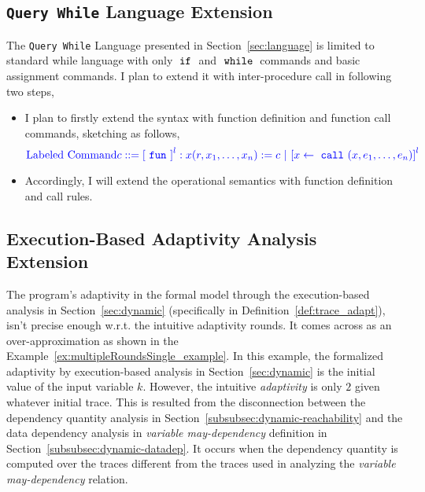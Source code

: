 \subsection{{\tt Query While} Language Extension}
\label{subsec:furthers-language}
The {\tt Query While} Language presented in Section~\ref*{sec:language} is limited to 
standard while language with only $\;\mathtt{if}\;$ and $\;\mathtt{while}\;$ commands and basic assignment commands.
I plan to extend it with inter-procedure call in following two steps,
\begin{itemize}
    \item I plan to firstly extend the syntax with  function definition and function call commands, sketching as follows,
\[
\highlight
{\mbox{Labeled Command} 
c ::= 
\clabel{\efun}^l: x(r, x_1, \ldots, x_n) := c
~|~ \clabel{\assign{x}{\ecall(x, e_1, \ldots, e_n)}}^l
}
\]
    \item Accordingly, I will extend the operational semantics with function definition and call rules.
\end{itemize}

\subsection{Execution-Based Adaptivity Analysis Extension}
\label{subsec:furthers-dep-depth}
%
The program's adaptivity in the formal model through the execution-based analysis in Section~\ref{sec:dynamic}
(specifically in Definition~\ref{def:trace_adapt}), isn't precise enough w.r.t. the intuitive adaptivity rounds.
It comes across as an over-approximation 
as shown in the Example~\ref{ex:multipleRoundsSingle_example}.
In this example, the formalized adaptivity by execution-based analysis in Section~\ref{sec:dynamic} 
is the initial value of the input variable $k$.
However, the intuitive \emph{adaptivity} is only $2$ given whatever initial trace.
This is resulted from the
disconnection between the 
dependency quantity analysis in Section~\ref{subsubsec:dynamic-reachability} and 
the data dependency analysis in \emph{variable may-dependency} definition in Section~\ref{subsubsec:dynamic-datadep}.
It occurs when the 
dependency quantity is computed over the traces different from the traces used in 
analyzing the \emph{variable may-dependency} relation.

